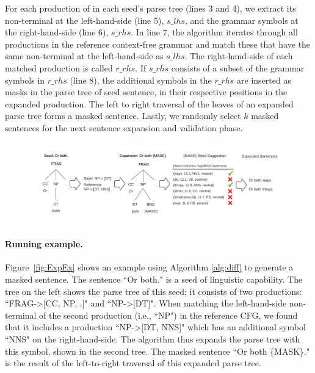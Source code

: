 


For each production of in each seed's parse tree (lines 3 and 4), we
extract its non-terminal at the left-hand-side (line 5), $s\_lhs$, and
the grammar symbols at the right-hand-side (line 6), $s\_rhs$. In line
7, the algorithm iterates through all productions in the reference
context-free grammar and match these that have the same non-terminal
at the left-hand-side as $s\_lhs$.  The right-hand-side of each
matched production is called $r\_rhs$.  If $s\_rhs$ consists of a
subset of the grammar symbols in $r\_rhs$ (line 8), the additional
symbols in the $r\_rhs$ are inserted as masks in the parse tree of
seed sentence, in their respective positions in the expanded
production.  The left to right traversal of the leaves of an expanded
parse tree forms a masked sentence.  Lastly, we randomly select $k$
masked sentences for the next sentence expansion and validation phase.

\begin{figure}[t]
  \centering
  \includegraphics[scale=0.7]{figs/running_example.pdf}
  \caption{\RunningExCaption}
\end{figure}

\paragraph{Running example.} Figure~\ref{fig:ExpEx} shows an example using Algorithm \ref{alg:diff}
to generate a masked sentence. The sentence ``Or both." is a seed of
 linguistic capability.  The tree on the left shows the
parse tree of this seed; it consists of two productions: ``FRAG->[CC,
  NP, .]" and ``NP->[DT]".  When matching the left-hand-side
non-terminal of the second production (i.e., ``NP") in the reference
CFG, we found that it includes a production ``NP->[DT, NNS]" which has
an additional symbol ``NNS" on the right-hand-side.  The algorithm
thus expands the parse tree with this symbol, shown in the second
tree.  The masked sentence ``Or both \{MASK\}." is the result of the
left-to-right traversal of this expanded parse tree.

